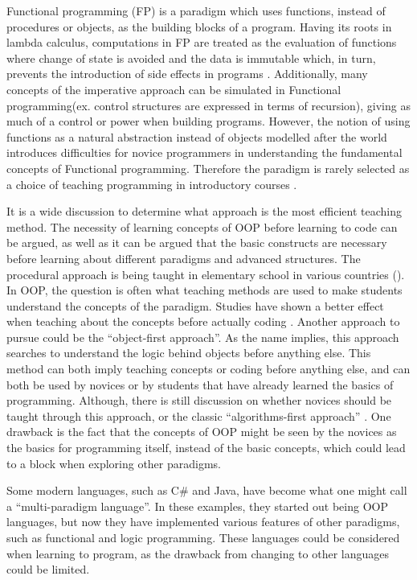 Functional programming (FP) is a paradigm which uses functions, instead of procedures or objects, as the building blocks of a program. Having its roots in lambda calculus, computations in FP are treated as the evaluation of functions where change of state is avoided and the data is immutable which, in turn, prevents the introduction of side effects in programs \cite{func_programming}. Additionally, many concepts of the imperative approach can be simulated in Functional programming(ex. control structures are expressed in terms of recursion), giving as much of a control or power when building programs. However, the notion of using functions as a natural abstraction instead of objects modelled after the world introduces difficulties for novice programmers in understanding the fundamental concepts of Functional programming. Therefore the paradigm is rarely selected as a choice of teaching programming in introductory courses \cite{TeachFuncProgramming}.

It is a wide discussion to determine what approach is the most efficient teaching method. The necessity of learning concepts of OOP before learning to code can be argued, as well as it can be argued that the basic constructs are necessary before learning about different paradigms and advanced structures. The procedural approach is being taught in elementary school in various countries (). In OOP, the question is often what teaching methods are used to make students understand the concepts of the paradigm. Studies have shown a better effect when teaching about the concepts before actually coding \cite{Xinogalos15}. Another approach to pursue could be the ``object-first approach''. As the name implies, this approach searches to understand the logic behind objects before anything else. This method can both imply teaching concepts or coding before anything else, and can both be used by novices or by students that have already learned the basics of programming. Although, there is still discussion on whether novices should be taught through this approach, or the classic ``algorithms-first approach'' \cite{Periyamasy12} . One drawback is the fact that the concepts of OOP might be seen by the novices as the basics for programming itself, instead of the basic concepts, which could lead to a block when exploring other paradigms.

Some modern languages, such as C\# and Java, have become what one might call a ``multi-paradigm language''. In these examples, they started out being OOP languages, but now they have implemented various features of other paradigms, such as functional and logic programming. These languages could be considered when learning to program, as the drawback from changing to other languages could be limited.